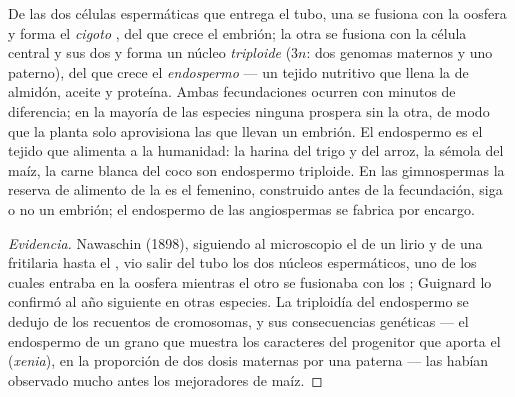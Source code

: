 \begin{proposition}\label{prop:b2:angiosperm-reproduction:double}
De las dos células espermáticas que entrega el tubo, una se fusiona con
la oosfera y forma el \emph{cigoto} , del que crece el embrión;
la otra se fusiona con la célula central y sus dos  y forma
un núcleo \emph{triploide} ($3n$: dos genomas maternos y uno paterno),
del que crece el \emph{endospermo} --- un tejido nutritivo que llena la
 de almidón, aceite y proteína. Ambas fecundaciones ocurren con
minutos de diferencia; en la mayoría de las especies ninguna prospera
sin la otra, de modo que la planta solo aprovisiona las  que
llevan un embrión. El endospermo es el tejido que alimenta a la
humanidad: la harina del trigo y del arroz, la sémola del maíz, la carne
blanca del coco son endospermo triploide. En las gimnospermas la reserva
de alimento de la  es el  femenino, construido antes de
la fecundación, siga o no un embrión; el endospermo de las angiospermas
se fabrica por encargo.
\end{proposition}
\begin{proof}[Evidencia]
Nawaschin (1898), siguiendo al microscopio el  de un lirio y
de una fritilaria hasta el , vio salir del tubo los dos
núcleos espermáticos, uno de los cuales entraba en la oosfera mientras
el otro se fusionaba con los ; Guignard lo confirmó al año
siguiente en otras especies. La triploidía del endospermo se dedujo de
los recuentos de cromosomas, y sus consecuencias genéticas --- el
endospermo de un grano que muestra los caracteres del progenitor que
aporta el  (\emph{xenia}), en la proporción de dos dosis maternas
por una paterna --- las habían observado mucho antes los mejoradores de
maíz.
\end{proof}
